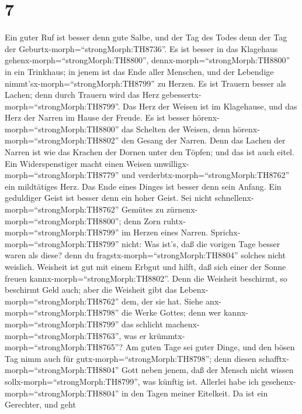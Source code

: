 \hypertarget{section-6}{%
\section{7}\label{section-6}}

 Ein guter Ruf ist besser denn gute Salbe, und der Tag des
Todes denn der Tag der Geburtx-morph=``strongMorph:TH8736''.
 Es ist besser in das Klagehaus
gehenx-morph=``strongMorph:TH8800'', dennx-morph=``strongMorph:TH8800''
in ein Trinkhaus; in jenem ist das Ende aller Menschen, und der
Lebendige nimmt'sx-morph=``strongMorph:TH8799'' zu Herzen. 
Es ist Trauern besser als Lachen; denn durch Trauern wird das Herz
gebessertx-morph=``strongMorph:TH8799''.  Das Herz der
Weisen ist im Klagehause, und das Herz der Narren im Hause der Freude.
 Es ist besser hörenx-morph=``strongMorph:TH8800'' das
Schelten der Weisen, denn hörenx-morph=``strongMorph:TH8802'' den Gesang
der Narren.  Denn das Lachen der Narren ist wie das Krachen
der Dornen unter den Töpfen; und das ist auch eitel.  Ein
Widerspenstiger macht einen Weisen
unwilligx-morph=``strongMorph:TH8779'' und
verderbtx-morph=``strongMorph:TH8762'' ein mildtätiges Herz.
 Das Ende eines Dinges ist besser denn sein Anfang. Ein
geduldiger Geist ist besser denn ein hoher Geist.  Sei nicht
schnellenx-morph=``strongMorph:TH8762'' Gemütes zu
zürnenx-morph=``strongMorph:TH8800''; denn Zorn
ruhtx-morph=``strongMorph:TH8799'' im Herzen eines Narren. 
Sprichx-morph=``strongMorph:TH8799'' nicht: Was ist's, daß die vorigen
Tage besser waren als diese? denn du
fragstx-morph=``strongMorph:TH8804'' solches nicht weislich.
 Weisheit ist gut mit einem Erbgut und hilft, daß sich
einer der Sonne freuen kannx-morph=``strongMorph:TH8802''. 
Denn die Weisheit beschirmt, so beschirmt Geld auch; aber die Weisheit
gibt das Lebenx-morph=``strongMorph:TH8762'' dem, der sie hat.
 Siehe anx-morph=``strongMorph:TH8798'' die Werke Gottes;
denn wer kannx-morph=``strongMorph:TH8799'' das schlicht
machenx-morph=``strongMorph:TH8763'', was er
krümmtx-morph=``strongMorph:TH8765''?  Am guten Tage sei
guter Dinge, und den bösen Tag nimm auch für
gutx-morph=``strongMorph:TH8798''; denn diesen
schafftx-morph=``strongMorph:TH8804'' Gott neben jenem, daß der Mensch
nicht wissen sollx-morph=``strongMorph:TH8799'', was künftig ist.
 Allerlei habe ich gesehenx-morph=``strongMorph:TH8804'' in
den Tagen meiner Eitelkeit. Da ist ein Gerechter, und geht
